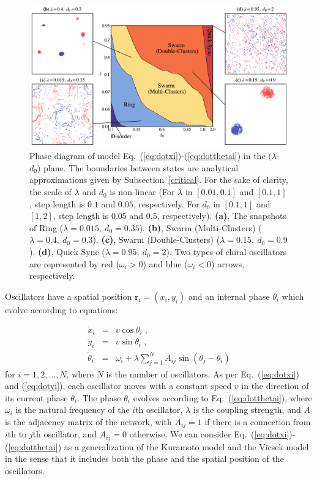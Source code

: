 \documentclass[%
 aip,
 amsmath,amssymb,
 reprint,%
]{revtex4-1}
\begin{document}
\begin{figure}
    \includegraphics[width=\textwidth]{./figs/phaseDiagram.pdf}
    \caption{
        \label{fig:phaseDiagram} Phase diagram of model Eq.~(\ref{eq:dotxi})-(\ref{eq:dotthetai}) in the $(\lambda$-$d_0)$ plane. The boundaries between states are analytical approximations given by Subsection~\ref{critical}. 
        For the sake of clarity, the scale of $\lambda$ and $d_0$ is non-linear (For $\lambda$ in $\left[ 0.01, 0.1 \right]$ and $\left[ 0.1, 1 \right]$, step length is $0.1$ and $0.05$, respectively. For $d_0$ in $\left[ 0.1, 1 \right]$ and $\left[ 1, 2 \right]$, step length is $0.05$ and $0.5$, respectively).
        \textbf{(a)}, The snapshots of Ring ($\lambda=0.015,\ d_0=0.35$). 
        \textbf{(b)}, Swarm (Multi-Clusters) ($\lambda=0.4,\ d_0=0.3$).
        \textbf{(c)}, Swarm (Double-Clusters) ($\lambda=0.15,\ d_0=0.9$).
        \textbf{(d)}, Quick Sync ($\lambda=0.95,\ d_0=2$). Two types of chiral oscillators are represented by red ($\omega_i > 0$) and blue 
        ($\omega_i < 0$) arrows, respectively. 
    }
\end{figure}

Oscillators have a spatial position $\mathbf{r}_i=\left( x_i, y_i \right)$ and an internal phase $\theta_i$ which evolve according to equations:

\begin{eqnarray}
    \dot{x}_i&=&v\cos \theta _i\;,\label{eq:dotxi}
  \\
    \dot{y}_i&=&v\sin \theta _i\;,\label{eq:dotyi}
  \\
    \dot{\theta}_i&=&\omega _i+\lambda \sum_{j=1}^N{A_{ij}\sin \left( \theta _j-\theta _i \right)}
    \label{eq:dotthetai}
\end{eqnarray}
for $i=1,2,\ldots,N$, where $N$ is the number of oscillators. As per Eq.~(\ref{eq:dotxi}) and (\ref{eq:dotyi}), each oscillator moves with a constant speed $v$ in the direction of its current phase $\theta_i$. The phase $\theta_i$ evolves according to Eq.~(\ref{eq:dotthetai}), where $\omega_i$ is the natural frequency of the $i$th oscillator, $\lambda$ is the coupling strength, and $A$ is the adjacency matrix of the network, with $A_{ij}=1$ if there is a connection from $i$th to $j$th oscillator, and $A_{ij}=0$ otherwise. We can consider Eq.~(\ref{eq:dotxi})-(\ref{eq:dotthetai}) as a generalization of the Kuramoto model and the Vicsek model in the sense that it includes both the phase and the spatial position of the oscillators.
\end{document}
